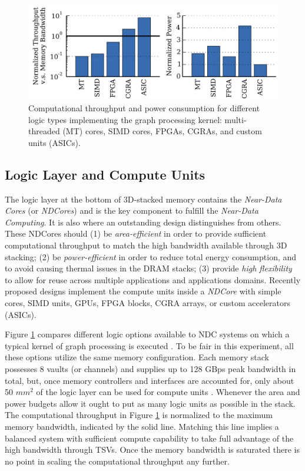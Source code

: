 \documentclass[letterpaper, 11pt, conference, margin=1in]{ieeeconf}   %
\begin{document}
\begin{figure}
    \center
    \includegraphics[scale=0.20]{figures/comparison_ndcores.png}
    \caption{Computational throughput and power consumption for different logic types implementing the graph processing kernel: multi-threaded (MT) cores, SIMD cores, FPGAs, CGRAs, and custom units (ASICs).}
    \label{fig:NDC-comparison}
\end{figure}

\subsection{\bf Logic Layer and Compute Units}
The logic layer at the bottom of 3D-stacked memory contains the \textit{Near-Data Cores} (or \textit{NDCores}) and is the key component to fulfill the \textit{Near-Data Computing}. It is also where an outstanding design distinguishes from others. These NDCores should (1) be \textit{area-efficient} in order to provide sufficient computational throughput to match the high bandwidth available through 3D stacking; (2) be \textit{power-efficient} in order to reduce total energy consumption, and to avoid causing thermal issues in the DRAM stacks; (3) provide \textit{high flexibility} to allow for reuse across multiple applications and applications domains. Recently proposed designs implement the compute units inside a \textit{NDCore} with simple cores, SIMD units, GPUs, FPGA blocks, CGRA arrays, or custom accelerators (ASICs).

Figure \ref{fig:NDC-comparison} compares different logic options available to NDC systems on which a typical kernel of graph processing is executed \cite{7446059}. To be fair in this experiment, all these options utilize the same memory configuration. Each memory stack possesses 8 vaults (or channels) and supplies up to 128 GBps peak bandwidth in total, but, once memory controllers and interfaces are accounted for, only about 50 $mm^2$ of the logic layer can be used for compute units \cite{6242474}. Whenever the area and power budgets allow it ought to put as many logic units as possible in the stack. The computational throughput in Figure \ref{fig:NDC-comparison} is normalized to the maximum memory bandwidth, indicated by the solid line. Matching this line implies a balanced system with sufficient compute capability to take full advantage of the high bandwidth through TSVs. Once the memory bandwidth is saturated there is no point in scaling the computational throughput any further.
\end{document}
